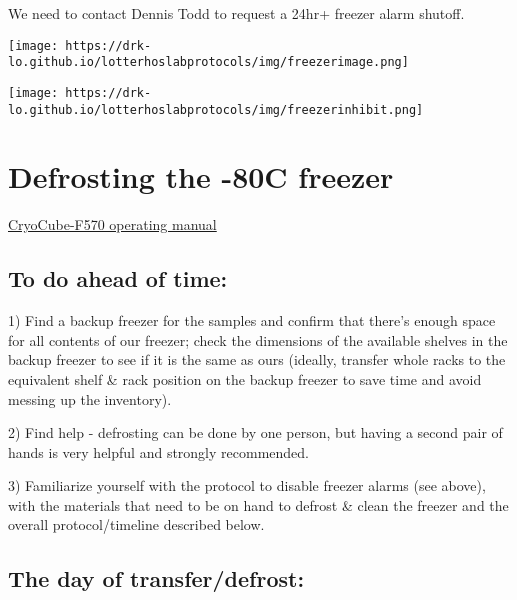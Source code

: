 \documentclass[
  letterpaper,
  DIV=11,
  numbers=noendperiod]{scrreprt}
\begin{document}
We need to contact Dennis Todd to request a 24hr+ freezer alarm shutoff.

\texttt{[image: https://drk-lo.github.io/lotterhoslabprotocols/img/freezerimage.png]}

\texttt{[image: https://drk-lo.github.io/lotterhoslabprotocols/img/freezerinhibit.png]}

\hypertarget{defrosting-the--80c-freezer}{%
\section*{\texorpdfstring{\textbf{Defrosting the -80C
freezer}}{Defrosting the -80C freezer}}\label{defrosting-the--80c-freezer}}


\href{https://github.com/DrK-Lo/lotterhoslabprotocols/files/7305953/Freezers_Operating-manual_CryoCube-F570n-h-hw.pdf}{CryoCube-F570
operating manual}

\hypertarget{to-do-ahead-of-time}{%
\subsection*{\texorpdfstring{\textbf{To do ahead of
time:}}{To do ahead of time:}}\label{to-do-ahead-of-time}}

1) Find a backup freezer for the samples and confirm that there's enough
space for all contents of our freezer; check the dimensions of the
available shelves in the backup freezer to see if it is the same as ours
(ideally, transfer whole racks to the equivalent shelf \& rack position
on the backup freezer to save time and avoid messing up the inventory).

2) Find help - defrosting can be done by one person, but having a second
pair of hands is very helpful and strongly recommended.

3) Familiarize yourself with the protocol to disable freezer alarms (see
above), with the materials that need to be on hand to defrost \& clean
the freezer and the overall protocol/timeline described below.

\hypertarget{the-day-of-transferdefrost}{%
\subsection*{\texorpdfstring{\textbf{The day of
transfer/defrost:}}{The day of transfer/defrost:}}\label{the-day-of-transferdefrost}}
\end{document}
